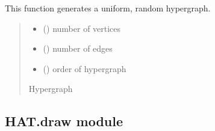 \documentclass[letterpaper,10pt,english]{sphinxmanual}
\begin{document}

\begin{fulllineitems}
\label{\detokenize{HAT:HAT.HAT.uniformErdosRenyi}}
\pysigstartsignatures
{}
\pysigstopsignatures
\sphinxAtStartPar
This function generates a uniform, random hypergraph.
\begin{quote}\begin{description}
\begin{itemize}
\item {} 
\sphinxAtStartPar
{} () \textendash{} number of vertices

\item {} 
\sphinxAtStartPar
{} () \textendash{} number of edges

\item {} 
\sphinxAtStartPar
{} () \textendash{} order of hypergraph

\end{itemize}

\sphinxAtStartPar
Hypergraph

\sphinxAtStartPar
{}

\end{description}\end{quote}

\end{fulllineitems}



\subsection{HAT.draw module}
\label{\detokenize{HAT:module-HAT.draw}}\label{\detokenize{HAT:hat-draw-module}}
\end{document}

